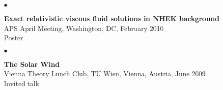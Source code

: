 \documentclass[margin,line]{res}
\newenvironment{list2}{
  \begin{list}{$\bullet$}{%
      \setlength{\itemsep}{0in}
      \setlength{\parsep}{0in} \setlength{\parskip}{0in}
      \setlength{\topsep}{0in} \setlength{\partopsep}{0in} 
      \setlength{\leftmargin}{0.2in}}}{\end{list}}
\begin{document}
\begin{resume}
\vspace*{-.13in}
\begin{list2}
\item[] {\bf Exact relativistic viscous fluid solutions in NHEK background} \\
APS April Meeting, Washington, DC, February 2010  \\
Poster \\
\end{list2}

\vspace*{-.13in}
\begin{list2}
\item[] {\bf The Solar Wind}\\ 
Vienna Theory Lunch Club, TU Wien, Vienna, Austria, June 2009  \\
Invited talk \\
\end{list2}

%
%
%


\end{resume}
\end{document}
